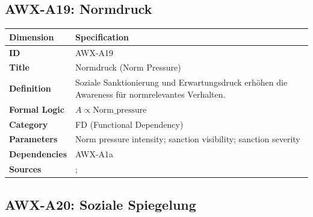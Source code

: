 
\subsection{AWX-A19: Normdruck}

\begin{table}[htbp]
\small
\begin{tabular}{p{3cm}p{11cm}}
\toprule
\textbf{Dimension} & \textbf{Specification} \\
\midrule
\textbf{ID} & AWX-A19 \\
\textbf{Title} & Normdruck (Norm Pressure) \\
\textbf{Definition} & Soziale Sanktionierung und Erwartungsdruck erhöhen die Awareness für normrelevantes Verhalten. \\
\textbf{Formal Logic} & $A \propto \text{Norm\_pressure}$ \\
\textbf{Category} & FD (Functional Dependency) \\
\textbf{Parameters} & Norm pressure intensity; sanction visibility; sanction severity \\
\textbf{Dependencies} & AWX-A1a \\
\textbf{Sources} & \citet{fehr2004social}; \citet{cialdini2004social} \\
\bottomrule
\end{tabular}
\end{table}


\subsection{AWX-A20: Soziale Spiegelung}

